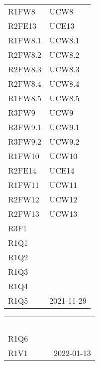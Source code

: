 \begin{table}[!htbp]
\begin{tabular}[t]{ m{}<{\centering}  m{}<{\centering} }
	R1FW8 & UCW8\\		
	
	R2FE13 & UCE13\\	
	 
	R1FW8.1 & UCW8.1\\	
	 
	R2FW8.2 & UCW8.2\\	
	 
	R2FW8.3 & UCW8.3\\	
	 
	R2FW8.4 & UCW8.4\\	 
	 
	R1FW8.5 & UCW8.5\\	 
	 
	R3FW9 & UCW9\\	
	 
	R3FW9.1 & UCW9.1\\	 
	 
	R3FW9.2 & UCW9.2\\	  
	 
	R1FW10 & UCW10 \\	 
	 
	R2FE14 & UCE14\\	 
	 	 
	R1FW11 & UCW11\\	 	 	 	

	R2FW12 & UCW12\\

	R2FW13 & UCW13\\

	R3F1 & \Di \\
	
	R1Q1 & \Di \\
	
	R1Q2 & \Ca \\
	
	R1Q3 & \Ca \\
	
	R1Q4 &  \Ca \\
	
	R1Q5 & \Vi{} 2021-11-29\\
	
\end{tabular}
\begin{tabular}[t]{ m{}<{\centering}  m{}<{\centering} }
	\rowcolor{darkblue}
	\textcolor{white}{\textbf{Requisito}} &\textcolor{white}{\textbf{Fonti}}\\ 

	R1Q6 & \Di \\

	R1V1 & \Vi{} 2022-01-13 \\	


\end{tabular}
\end{table}

